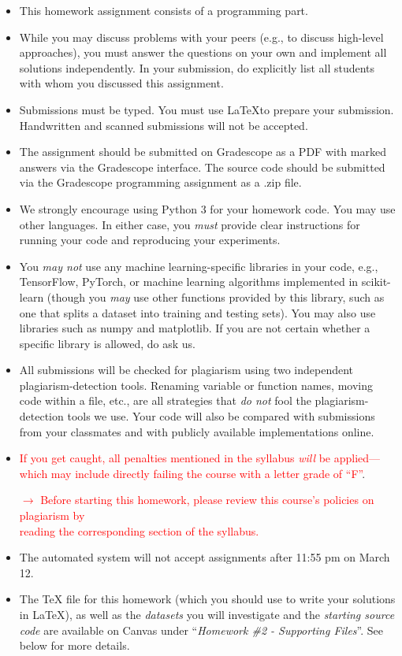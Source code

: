 \documentclass{article}
\begin{document}
\begin{itemize}
    \item This homework assignment consists of a programming part. 
    \item While you may discuss problems with your peers (e.g., to discuss high-level approaches), you must answer the questions on your own and implement all solutions independently. In your submission, do explicitly list all students with whom you discussed this assignment. 
    \item Submissions must be typed. You must use \LaTeX to prepare your submission. Handwritten and scanned submissions will not be accepted. 
    \item The assignment should be submitted on Gradescope as a PDF with marked answers via the Gradescope interface. The source code should be submitted via the Gradescope programming assignment as a .zip file. 
    \item We strongly encourage using Python 3 for your homework code. You may use other languages. In either case, you \textit{must} provide clear instructions for running your code and reproducing your experiments. 
    \item You \textit{may not} use any machine learning-specific libraries in your code, e.g., TensorFlow, PyTorch, or machine learning algorithms implemented in scikit-learn (though you \textit{may} use other functions provided by this library, such as one that splits a dataset into training and testing sets). You may also use libraries such as numpy and matplotlib. If you are not certain whether a specific library is allowed, do ask us.
    \item All submissions will be checked for plagiarism using two independent plagiarism-detection tools. Renaming variable or function names, moving code within a file, etc., are all strategies that \textit{do not} fool the plagiarism-detection tools we use. Your code will also be compared with submissions from your classmates and with publicly available implementations online. 
    \item \textcolor{red}{If you get caught, all penalties mentioned in the syllabus \textit{will} be applied---which may include directly failing the course with a letter grade of ``F''}.
    \begin{center}
        \textcolor{red}{$\rightarrow$ Before starting this homework, please review this course's policies on plagiarism by  \\reading the corresponding section of the syllabus.}
    \end{center}
    \item The automated system will not accept assignments after 11:55 pm on March 12. 
    \item The TeX file for this homework (which you should use to write your solutions in \LaTeX), as well as the \textit{datasets} you will investigate and the \textit{starting source code} are available on Canvas under ``\textit{Homework \#2 - Supporting Files}''. See below for more details.
\end{itemize}
\end{document}
